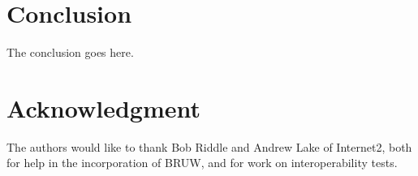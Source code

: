 \documentclass[conference]{IEEEtran}
\begin{document}
%



%


\section{Conclusion}
The conclusion goes here.


\section*{Acknowledgment}
The authors would like to thank Bob Riddle and Andrew Lake of Internet2, both
for help in the incorporation of BRUW, and for work on interoperability tests.
\end{document}
